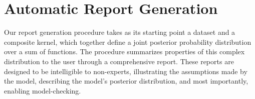 \documentclass{article} %
\begin{document}
\section{Automatic Report Generation}
\label{sec:method}
\vspace{-0.08in}

Our report generation procedure takes as its starting point a dataset and a composite kernel, which together define a joint posterior probability distribution over a sum of functions.
The procedure summarizes properties of this complex distribution to the user through a comprehensive report.
%
These reports are designed to be intelligible to non-experts, illustrating the assumptions made by the model, describing the model's posterior distribution, and most importantly, enabling model-checking.
%
%
%
%
%
\end{document}
